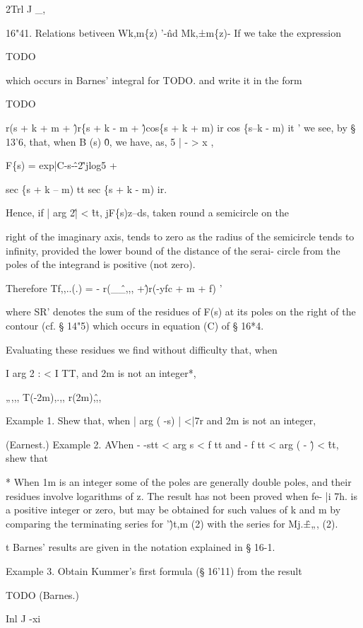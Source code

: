 2Trl J \_,

16"41. Relations betiveen Wk,m\{z) '-\^nd Mk,±m\{z)- If we take the
expression

TODO

which occurs in Barnes' integral for TODO. and write it in the form

TODO

r(s + k + m + \^)r\{s + k - m + \^)cos\{s + k + m) ir cos \{s--k - m)
it ' we see, by § 13'6, that, when B (s) \^ 0, we have, as, 5 | - > x
,

F\{s) = exp|C-s-\^-2\^'jlog5 +

sec \{s + k -- m) tt sec \{s + k - m) ir.

Hence, if | arg 2\^ | < \^ tt, jF\{s)z--ds, taken round a semicircle
on the

right of the imaginary axis, tends to zero as the radius of the
semicircle tends to infinity, provided the lower bound of the distance
of the serai- circle from the poles of the integrand is positive (not
zero).

Therefore Tf,,..(.) = - r(\_\^\_,,, +\^)r(-yfc + m + f) '

where SR' denotes the sum of the residues of F(s) at its poles on the
right of the contour (cf. § 14"5) which occurs in equation (C) of §
16*4.

Evaluating these residues we find without difficulty that, when

I arg 2 : < I TT, and 2m is not an integer*,

„,,, T(-2m),.,, r(2m),\^,,

Example 1. Shew that, when | arg ( -s) | <|7r and 2m is not an
integer,

(Earnest.) Example 2. AVhen - -stt < arg s < f tt and - f tt < arg ( -
\^) < \^tt, shew that

* When 1m is an integer some of the poles are generally double poles,
and their residues involve logarithms of z. The result has not been
proved when fe- |i 7h. is a positive integer or zero, but may be
obtained for such values of k and m by comparing the terminating
series for '\^)t,m (2) with the series for Mj.\^±„, (2).

t Barnes' results are given in the notation explained in § 16-1.

%
%

Example 3. Obtain Kummer's first formula (§ 16'11) from the result

TODO (Barnes.)

Inl J -xi

